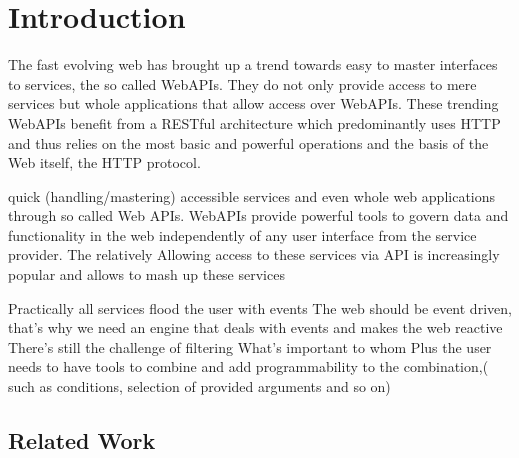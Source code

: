 \chapter{Introduction}
%
%




The fast evolving web has brought up a trend towards easy to master interfaces to services, the so called WebAPIs.
They do not only provide access to mere services but whole applications that allow access over WebAPIs.
These trending WebAPIs benefit from a RESTful architecture which predominantly uses HTTP and thus relies on the most basic and powerful operations and the basis of the Web itself, the HTTP protocol. 

quick (handling/mastering) accessible services and even whole web applications through so called Web APIs.
WebAPIs provide powerful tools to govern data and functionality in the web independently of any user interface from the service provider.
The relatively
Allowing access to these services via API is increasingly popular and allows to mash up these services

Practically all services flood the user with events
The web should be event driven, that's why we need an engine that deals with events and makes the web reactive
There's still the challenge of filtering
What's important to whom
Plus the user needs to have tools to combine and add programmability to the combination,( such as conditions, selection of provided arguments and so on)



\section{Related Work}
%


